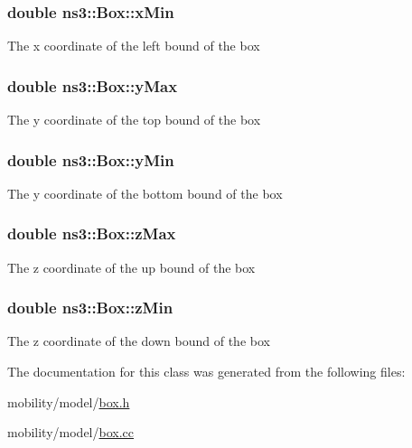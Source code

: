 \subsubsection[{\texorpdfstring{x\+Min}{xMin}}]{\setlength{\rightskip}{0pt plus 5cm}double ns3\+::\+Box\+::x\+Min}\hypertarget{classns3_1_1Box_a1fd6a43d53258323331d34da600ff1c5}{}\label{classns3_1_1Box_a1fd6a43d53258323331d34da600ff1c5}
The x coordinate of the left bound of the box 
\subsubsection[{\texorpdfstring{y\+Max}{yMax}}]{\setlength{\rightskip}{0pt plus 5cm}double ns3\+::\+Box\+::y\+Max}\hypertarget{classns3_1_1Box_a001fd430a14b19efe925c818a332e392}{}\label{classns3_1_1Box_a001fd430a14b19efe925c818a332e392}
The y coordinate of the top bound of the box 
\subsubsection[{\texorpdfstring{y\+Min}{yMin}}]{\setlength{\rightskip}{0pt plus 5cm}double ns3\+::\+Box\+::y\+Min}\hypertarget{classns3_1_1Box_a3865ed092f941186823539c9979002f8}{}\label{classns3_1_1Box_a3865ed092f941186823539c9979002f8}
The y coordinate of the bottom bound of the box 
\subsubsection[{\texorpdfstring{z\+Max}{zMax}}]{\setlength{\rightskip}{0pt plus 5cm}double ns3\+::\+Box\+::z\+Max}\hypertarget{classns3_1_1Box_ae4d135764bbc8421fe82ec91e4693b59}{}\label{classns3_1_1Box_ae4d135764bbc8421fe82ec91e4693b59}
The z coordinate of the up bound of the box 
\subsubsection[{\texorpdfstring{z\+Min}{zMin}}]{\setlength{\rightskip}{0pt plus 5cm}double ns3\+::\+Box\+::z\+Min}\hypertarget{classns3_1_1Box_a9ab297b877a5c31dbfb344bd6f027e91}{}\label{classns3_1_1Box_a9ab297b877a5c31dbfb344bd6f027e91}
The z coordinate of the down bound of the box 

The documentation for this class was generated from the following files\+:\begin{DoxyCompactItemize}
\item 
mobility/model/\hyperlink{box_8h}{box.\+h}\item 
mobility/model/\hyperlink{box_8cc}{box.\+cc}\end{DoxyCompactItemize}
